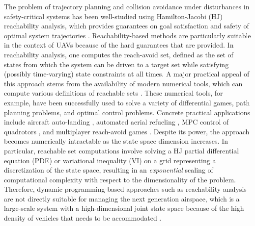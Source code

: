 The problem of trajectory planning and collision avoidance under disturbances in safety-critical systems has been well-studied using Hamilton-Jacobi (HJ) reachability analysis, which provides guarantees on goal satisfaction and safety of optimal system trajectories \cite{Barron90, Mitchell05, Bokanowski10, Bokanowski11, Margellos11, Fisac15}. Reachability-based methods are particularly suitable in the context of UAVs because of the hard guarantees that are provided. In reachability analysis, one computes the reach-avoid set, defined as the set of states from which the system can be driven to a target set while satisfying (possibly time-varying) state constraints at all times. A major practical appeal of this approach stems from the availability of modern numerical tools, which can compute various definitions of reachable sets \cite{Sethian96, Osher02, Mitchell02, Mitchell07b}. These numerical tools, for example, have been successfully used to solve a variety of differential games, path planning problems, and optimal control problems. Concrete practical applications include aircraft auto-landing \cite{Bayen07}, automated aerial refueling \cite{Ding08}, MPC control of quadrotors \cite{Bouffard12}, and multiplayer reach-avoid games \cite{Huang11}. Despite its power, the approach becomes numerically intractable as the state space dimension increases. In particular, reachable set computations involve solving a HJ partial differential equation (PDE) or variational inequality (VI) on a grid representing a discretization of the state space, resulting in an \textit{exponential} scaling of computational complexity with respect to the dimensionality of the problem. Therefore, dynamic programming-based approaches such as reachability analysis are not directly suitable for managing the next generation airspace, which is a large-scale system with a high-dimensional joint state space because of the high density of vehicles that needs to be accommodated \cite{Kopardekar16}.  

